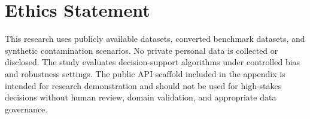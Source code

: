 \chapter*{Ethics Statement}

This research uses publicly available datasets, converted benchmark datasets, and synthetic contamination scenarios. No private personal data is collected or disclosed. The study evaluates decision-support algorithms under controlled bias and robustness settings. The public API scaffold included in the appendix is intended for research demonstration and should not be used for high-stakes decisions without human review, domain validation, and appropriate data governance.
